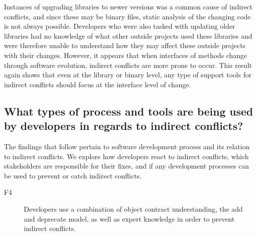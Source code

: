 \documentclass[conference]{IEEEtran}
\makeatletter
\def\namedlabel#1#2{\begingroup
   \def\@currentlabel{#2}%
   \label{#1}\endgroup
}
\makeatother
\begin{document}
Instances of upgrading libraries to newer versions was a common cause of indirect conflicts, and since these may be binary files,
static analysis of the changing code is not always possible. Developers who were also
tasked with updating older libraries had no knowledge of what other outside projects used these libraries and were therefore unable to understand
how they may affect these outside projects with their changes. However, it appears that when interfaces of methods change through software
evolution, indirect conflicts are more prone to occur. This result again shows that even at the library or binary level, any type of support tools for indirect
conflicts should focus at the interface level of change.

\subsection{What types of process and tools are being used by developers in regards to indirect conflicts?}

The findings that follow pertain to software development process and its relation to indirect conflicts. We explore
how developers react to indirect conflicts, which stakeholders are responsible for their fixes, and if any development
processes can be used to prevent or catch indirect conflicts.

\begin{description}
	\item[F4\namedlabel{itm:f4}{F4}] Developers use a combination of object contract understanding, the add and deprecate model, as well as expert 
																	 knowledge in order to prevent indirect conflicts.
\end{description}
\end{document}
